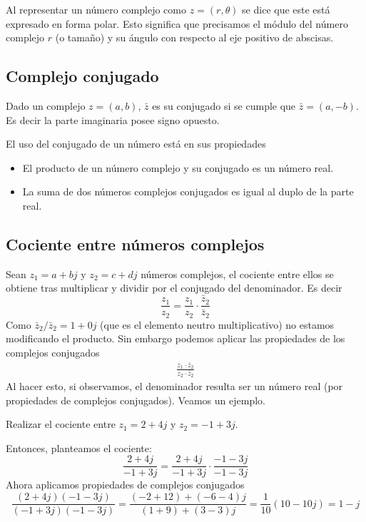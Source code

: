Al representar un número complejo como $z=(r,\theta)$ se dice que este está expresado en forma polar. Esto significa que precisamos el módulo del número complejo $r$ (o tamaño) y su ángulo con respecto al eje positivo de abscisas. 

\subsection{Complejo conjugado}

Dado un complejo $z=(a,b)$, $\bar{z}$ es su conjugado si se cumple que $\bar{z}=(a,-b)$. Es decir la parte imaginaria posee signo opuesto.

El uso del conjugado de un número está en sus propiedades
\begin{itemize}
  \item El producto de un número complejo y su conjugado es un número real.
  \item La suma de dos números complejos conjugados es igual al duplo de la parte real.
\end{itemize}

\subsection{Cociente entre números complejos}

Sean $z_1=a+bj$ y $z_2=c+dj$ números complejos, el cociente entre ellos se obtiene tras multiplicar y dividir por el conjugado del denominador. Es decir
$$
\frac{z_1}{z_2} = \frac{z_1}{z_2}\cdot \frac{\bar{z}_2}{\bar{z}_2}
$$
Como $\bar{z}_2/\bar{z}_2=1+0j$ (que es el elemento neutro multiplicativo) no estamos modificando el producto. Sin embargo podemos aplicar las propiedades de los complejos conjugados
\begin{align*}
  \frac{z_1\cdot \bar{z}_2}{z_2 \cdot \bar{z}_2}
\end{align*}
Al hacer esto, si observamos, el denominador resulta ser un número real (por propiedades de complejos conjugados). Veamos un ejemplo.
\begin{example}
  Realizar el cociente entre $z_1=2+4j$ y $z_2=-1+3j$. 

  Entonces, planteamos el cociente:
  $$
  \frac{2+4j}{-1+3j} = \frac{2+4j}{-1+3j}\cdot\frac{-1-3j}{-1-3j}
  $$
  Ahora aplicamos propiedades de complejos conjugados
  $$
  \frac{(2+4j)(-1-3j)}{(-1+3j)(-1-3j)}=\frac{(-2+12)+(-6-4)j}{(1+9)+(3-3)j} = \frac{1}{10}(10-10j) = 1-j
  $$
\end{example}

